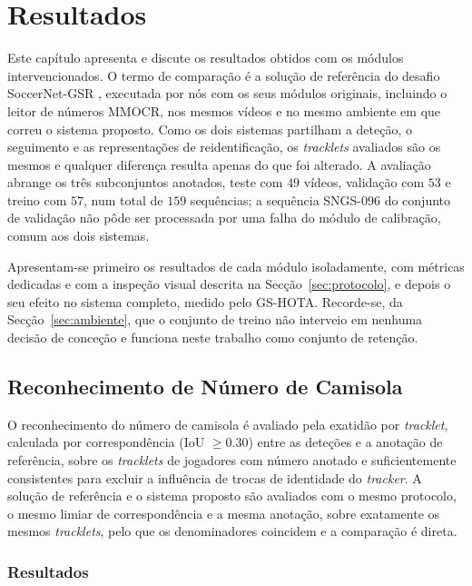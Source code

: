 \chapter{Resultados}\label{cap:resultados}

Este capítulo apresenta e discute os resultados obtidos com os módulos intervencionados. O termo de
comparação é a solução de referência do desafio SoccerNet-GSR \citep{somers2024soccernet}, executada
por nós com os seus módulos originais, incluindo o leitor de números MMOCR, nos mesmos vídeos e no
mesmo ambiente em que correu o sistema proposto. Como os dois sistemas partilham a deteção, o
seguimento e as representações de reidentificação, os \emph{tracklets} avaliados são os mesmos e
qualquer diferença resulta apenas do que foi alterado. A avaliação abrange os três subconjuntos
anotados, teste com $49$ vídeos, validação com $53$ e treino com $57$, num total de $159$ sequências;
a sequência SNGS-096 do conjunto de validação não pôde ser processada por uma falha do módulo de
calibração, comum aos dois sistemas.

Apresentam-se primeiro os resultados de cada módulo isoladamente, com métricas dedicadas e com a
inspeção visual descrita na Secção~\ref{sec:protocolo}, e depois o seu efeito no sistema completo,
medido pelo GS-HOTA. Recorde-se, da Secção~\ref{sec:ambiente}, que o conjunto de treino não interveio
em nenhuma decisão de conceção e funciona neste trabalho como conjunto de retenção.

\section{Reconhecimento de Número de Camisola}\label{sec:res_jnr}

O reconhecimento do número de camisola é avaliado pela exatidão por \emph{tracklet}, calculada por
correspondência (IoU $\geq 0.30$) entre as deteções e a anotação de referência, sobre os
\emph{tracklets} de jogadores com número anotado e suficientemente consistentes para excluir a
influência de trocas de identidade do \emph{tracker}. A solução de referência e o sistema proposto
são avaliados com o mesmo protocolo, o mesmo limiar de correspondência e a mesma anotação, sobre
exatamente os mesmos \emph{tracklets}, pelo que os denominadores coincidem e a comparação é direta.

\subsection{Resultados}\label{sec:res_jnr_resultados}

